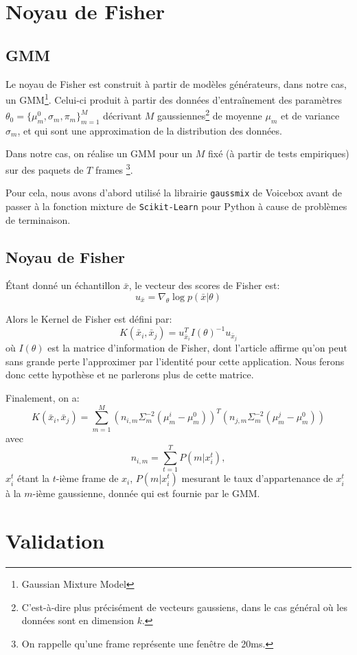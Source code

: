 \documentclass{article}
\begin{document}
\section{Noyau de Fisher}
\label{fisher}
\subsection{GMM}
\label{gmm}
Le noyau de Fisher est construit à partir de modèles générateurs, dans notre cas, un GMM\footnote{Gaussian Mixture Model}.
Celui-ci produit à partir des données d'entraînement des paramètres $\theta_0 = \lbrace \mu_m^0, \sigma_m, \pi_m \rbrace_{m=1}^M$ décrivant $M$ gaussiennes\footnote{C'est-à-dire plus précisément de vecteurs gaussiens, dans le cas général où les données sont en dimension $k$.} de moyenne $\mu_m$ et de variance $\sigma_m$, et qui sont une approximation de la distribution des données.

Dans notre cas, on réalise un GMM pour un $M$ fixé (à partir de tests empiriques) sur des paquets de $T$ \og frames \fg \footnote{On rappelle qu'une frame représente une fenêtre de 20ms.}.

Pour cela, nous avons d'abord utilisé la librairie \texttt{gaussmix} de Voicebox avant de passer à la fonction mixture de \texttt{Scikit-Learn} pour Python à cause de problèmes de terminaison.
\subsection{Noyau de Fisher}
Étant donné un échantillon $\bar{x}$, le vecteur des scores de Fisher est:
\[u_{\bar{x}} = \nabla_{\theta} \log p (\bar{x} | \theta) \]

Alors le Kernel de Fisher est défini par:
\[K(\bar{x}_i,\bar{x}_j) = u_{\bar{x}_i}^{T} I(\theta)^{-1} u_{\bar{x}_j}\]
où $I(\theta)$ est la matrice d'information de Fisher, dont l'article affirme qu'on peut sans grande perte l'approximer par l'identité pour cette application. Nous ferons donc cette hypothèse et ne parlerons plus de cette matrice.


Finalement, on a:
\[ K(\bar{x}_i,\bar{x}_j) = \sum_{m=1}^M (n_{i,m} \Sigma_m^{-2} (\mu_m^i - \mu_m^0))^{T} (n_{j,m} \Sigma_m^{-2} (\mu_m^j - \mu_m^0)) \]
avec
\[n_{i,m} = \sum_{t=1}^{T} P(m | x_i^t),\]
$x_i^t$ étant la $t$-ième frame de $x_i$, $P(m | x_i^t)$ mesurant le taux d'appartenance de $x_i^t$ à la $m$-ième gaussienne, donnée qui est fournie par le GMM.


\section{Validation}
\label{validation}
\end{document}
